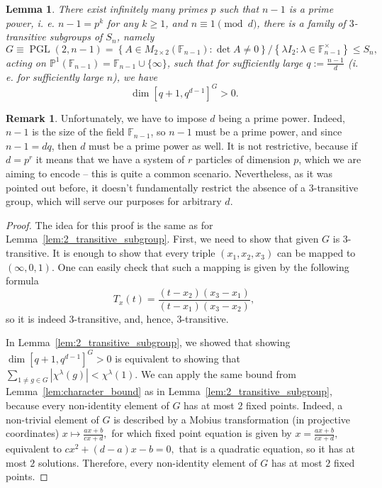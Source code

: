\documentclass[10pt,twocolumn,superscriptaddress,aps,amsmath,amssymb,citeautoscript,floatfix,prx]{revtex4-2}
\theoremstyle{plain}
\theoremstyle{plain}
\theoremstyle{plain}
\theoremstyle{plain}
\theoremstyle{plain}
\theoremstyle{plain}
\theoremstyle{plain}
\newtheorem{smlemma}[smtheorem]{Lemma}
\theoremstyle{definition}
\newtheorem{smremark}[smtheorem]{Remark}
\theoremstyle{plain}
\begin{document}
\begin{appendix}
\begin{smlemma} \label{lem:3_transitive_subgroup}
    There exist infinitely many primes $p$ such that $n-1$ is a prime power, i. e. $n-1=p^k$ for any $k\geq 1$, and $n\equiv 1 \pmod{d}$, there is a family of $3$-transitive subgroups of $S_n$, namely
    \begin{equation}\label{eq:3_transitive_subgroup}
        G\equiv\operatorname{PGL}(2, n-1)=\left\{A \in M_{2 \times 2}\left(\mathbb{F}_{n-1}\right): \operatorname{det} A \neq 0\right\}/\left\{\lambda I_2: \lambda \in \mathbb{F}_{n-1}^{\times}\right\}\leq S_n,
    \end{equation}
    acting on $\mathbb{P}^1\left(\mathbb{F}_{n-1}\right)=\mathbb{F}_{n-1} \cup\{\infty\}$, such that for sufficiently large $q:=\frac{n-1}{d}$ (i. e. for sufficiently large $n$), we have 
    \[\dim [q+1, q^{d-1}]^G > 0.\]
\end{smlemma}

\begin{smremark}
    Unfortunately, we have to impose $d$ being a prime power. Indeed, $n-1$ is the size of the field $\mathbb{F}_{n-1}$, so $n-1$ must be a prime power,
    and since $n-1=d q$, then $d$ must be a prime power as well. It is not restrictive, because if $d=p^r$ it means that we have a system of $r$ particles
    of dimension $p$, which we are aiming to encode -- this is quite a common scenario.
    Nevertheless, as it was pointed out before, it doesn't fundamentally restrict the absence of a 3-transitive group, which will serve our purposes
    for arbitrary $d$.
\end{smremark}

\begin{proof}
    The idea for this proof is the same as for Lemma~\ref{lem:2_transitive_subgroup}. 
    First, we need to show that given $G$ is $3$-transitive. It is enough to show that every triple $(x_1, x_2, x_3)$ can be mapped to $(\infty, 0, 1)$. One can easily check that such a mapping is given by the following formula
    \[
        T_x(t)=\frac{\left(t-x_2\right)\left(x_3-x_1\right)}{\left(t-x_1\right)\left(x_3-x_2\right)},
    \]
    so it is indeed $3$-transitive, and, hence, $3$-transitive.

    In Lemma~\ref{lem:2_transitive_subgroup}, we showed that showing $\dim [q+1, q^{d-1}]^G > 0$ is equivalent to showing that $\sum_{1 \neq g \in G}\left|\chi^\lambda(g)\right|<\chi^\lambda(1)$. 
    We can apply the same bound from Lemma~\ref{lem:character_bound} as in Lemma~\ref{lem:2_transitive_subgroup}, because every non-identity element of $G$ has at most $2$ fixed points. 
    Indeed, a non-trivial element of $G$ is described by a Mobius transformation (in projective coordinates) 
    $
        x \mapsto \frac{a x+b}{c x+d},
    $
    for which fixed point equation is given by
    $
        x = \frac{a x+b}{c x+d},
    $
    equivalent to
    $
        c x^2+(d-a) x-b=0,
    $
    that is a quadratic equation, so it has at most $2$ solutions. Therefore, every non-identity element of $G$ has at most $2$ fixed points.


\end{proof}
\end{appendix}
\end{document}
